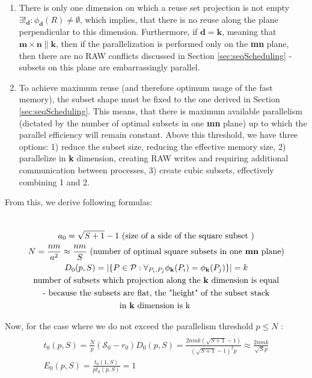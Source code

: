 \documentclass[sigplan,review,anonymous]{acmart}\settopmatter{printfolios=true,printccs=false,printacmref=false}
\begin{document}
\begin{enumerate}
\item There is only one dimension on 
which a reuse set projection is not empty $\exists!_{\mathbf{d}}: 
\phi_{\mathbf{d}}(R) \ne 
\emptyset$, which implies, that there is no reuse along the plane 
perpendicular 
to this dimension. Furthermore, if $\mathbf{d} = \mathbf{k}$, meaning that 
$\mathbf{m} \times \mathbf{n} \parallel \mathbf{k}$, then if the 
parallelization is performed only on the \textbf{mn} plane, then there are 
no RAW 
conflicts discussed in Section \ref{sec:seqScheduling} - subsets on 
this 
plane are embarrassingly parallel. 
\item To achieve maximum reuse (and therefore optimum usage 
of the fast memory), the subset shape must be fixed to the one derived 
in 
Section \ref{sec:seqScheduling}. This means, that there is maximum 
available 
parallelism (dictated by the number of optimal subsets in one 
\textbf{mn} plane) up to which the parallel efficiency will remain 
constant. Above this threshold, we have three options: 1) reduce the 
subset size, reducing the effective memory size, 2) parallelize in 
\textbf{k} dimension, creating RAW writes and requiring additional 
communication between processes, 3) create cubic subsets, effectively 
combining 1 and 2.
\end{enumerate}

From this, we derive following formulas:

\begin{multline}
\\
a_0 = \sqrt{S+1} - 1  \text{ (size of a side of the square subset )}\\
N = \frac{nm}{a^2} \approx \frac{nm}{S} \text{ (number of optimal square 
	subsets in one \textbf{mn} plane)}\\
D_0(p,S) = |\{P \in \mathcal{P} : \forall_{P_i, P_j} \phi_{\mathbf{k}}(P_i) = 
\phi_{\mathbf{k}}(P_j)\}| = k \\
\text{number of subsets which projection along the \textbf{k} dimension is 
	equal} \\ 
\text{- because the subsets are flat, the "height" of the 
	subset stack}
\\ 
\text{in \textbf{k} dimension is k }\\
\end{multline}

Now, for the case where we do not exceed the parallelism threshold $p \le N$ : 
\begin{multline}
\\
t_0(p,S) = \frac{N}{p} (\mathcal{S}_0 - r_0) D_0(p,S) = \frac{2nmk(\sqrt{S+1} 
	- 
	1)}{(\sqrt{S+1} - 1)^2 p} \approx \frac{2nmk}{\sqrt{S} p} \\
E_0(p,S) = \frac{t_0(1,S)}{p t_0(p,S)} = 1 \\
\end{multline}
\end{document}
